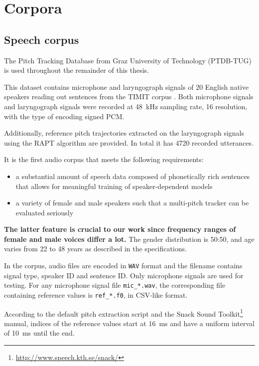 \documentclass[11pt,a4paper]{report}
\begin{document}
\chapter{Corpora}

\section{Speech corpus}

The Pitch Tracking Database from Graz University of Technology (PTDB-TUG) \parencite{pirker2011pitch} is used throughout the remainder of this thesis.

This dataset contains microphone and laryngograph signals of 20 English native speakers reading out sentences from the TIMIT corpus \parencite{garofolo1993darpa}.
Both microphone signals and laryngograph signals were recorded at \SI{48}{\kilo\hertz} sampling rate, \SI{16}{\bit} resolution, with the type of encoding signed PCM.

Additionally, reference pitch trajectories extracted on the laryngograph signals using the RAPT algorithm \parencite{talkin1995robust} are provided.
In total it has \num{4720} recorded utterances.

It is the first audio corpus that meets the following requirements:

\begin{itemize}
  \item a substantial amount of speech data composed of phonetically rich sentences that allows for meaningful training of speaker-dependent models
  \item a variety of female and male speakers such that a multi-pitch tracker can be evaluated seriously
\end{itemize}

\textbf{The latter feature is crucial to our work since frequency ranges of female and male voices differ a lot.} The gender distribution is 50:50, and age varies from 22 to 48 years as described in the specifications.

\bigskip

In the corpus, audio files are encoded in \texttt{WAV} format and the filename contains signal type, speaker ID and sentence ID\@.
Only microphone signals are used for testing.
For any microphone signal file \texttt{mic\_*.wav}, the corresponding file containing reference values is \texttt{ref\_*.f0}, in CSV-like format.

According to the default pitch extraction script and the Snack Sound Toolkit\footnote{\url{http://www.speech.kth.se/snack/}} manual, indices of the reference values start at \SI{16}{\milli\second} and have a uniform interval of \SI{10}{\milli\second} until the end.
\end{document}
